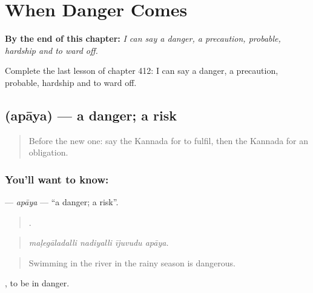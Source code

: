 
\chapter{When Danger Comes}
\label{ch:ka-when-danger-comes}

\begin{chapteropening}
\textbf{By the end of this chapter:} \emph{I can say a danger, a precaution, probable, hardship and to ward off.}

Complete the last lesson of chapter 412: I can say a danger, a precaution, probable, hardship and to ward off.
\end{chapteropening}

\section[\texorpdfstring{\kn{ಅಪಾಯ} (apāya)}{ಅಪಾಯ (apāya)}]{ (apāya) — a danger; a risk}

\label{lesson:KA-C412-apaya}



\begin{quote}
Before the new one: say the Kannada for to fulfil, then the Kannada for an obligation.
\end{quote}

\subsection*{You'll want to know: }
\textbf{} — \emph{apāya} — \textquotedblleft{}a danger; a risk\textquotedblright{}.

\begin{quote}
   .
\end{quote}

\begin{quote}
\emph{maḷegāladalli nadiyalli ījuvudu apāya.}
\end{quote}

\begin{quote}
Swimming in the river in the rainy season is dangerous.
\end{quote}

 , to be in danger.

